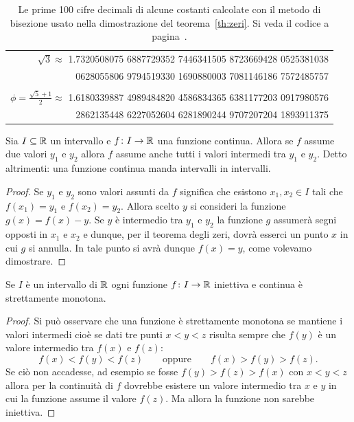 \begin{table}
\begin{center}
\begin{tabular}{r}
\\
$\sqrt 3 \approx$ \ttfamily\footnotesize 
1.7320508075 6887729352 7446341505 8723669428 0525381038 \\ \ttfamily\footnotesize
0628055806 9794519330 1690880003 7081146186 7572485757 \\
\\
$\phi = \frac{\sqrt 5+1}{2} \approx $ \ttfamily\footnotesize 
1.6180339887 4989484820 4586834365 6381177203 0917980576 \\ \ttfamily\footnotesize
2862135448 6227052604 6281890244 9707207204 1893911375
  \end{tabular}
\end{center}
\caption{Le prime 100 cifre decimali di alcune
costanti calcolate con il metodo di bisezione usato nella dimostrazione
del teorema~\ref{th:zeri}.
Si veda il codice a pagina~\pageref{code:bisection}.}
\label{fig:cifre_sqrt2}
\end{table}

\begin{theorem}
\label{th:valori_intermedi}%
\mymark{**}%
%
%
%
Sia $I\subseteq {\mathbb R}$ un intervallo e $f\colon I \to {\mathbb R}$ una
funzione continua.
Allora se $f$ assume due valori $y_1$ e $y_2$ allora $f$
assume anche tutti i valori intermedi tra $y_1$ e $y_2$.
Detto altrimenti: una funzione continua
manda intervalli in intervalli.
\end{theorem}
%
\begin{proof}
Se $y_1$ e $y_2$ sono valori assunti da $f$ significa
che esistono $x_1,x_2 \in I$ tali che $f(x_1)= y_1$ e $f(x_2)=y_2$.
Allora scelto $y$ si consideri la funzione $g(x) = f(x)-y$.
Se $y$ è intermedio tra $y_1$ e $y_2$ la funzione $g$ assumerà
segni opposti in $x_1$ e $x_2$ e dunque, per il teorema degli zeri,
dovrà esserci un punto $x$ in cui $g$ si annulla. In tale punto
si avrà dunque $f(x)=y$, come volevamo dimostrare.
\end{proof}

\begin{lemma}
\label{ex:inversa_monotona}%
Se $I$ è un intervallo di ${\mathbb R}$ ogni funzione $f\colon I \to {\mathbb R}$
iniettiva e continua è strettamente monotona.
\end{lemma}
%
\begin{proof}
Si può osservare che una funzione è strettamente monotona se mantiene i valori
intermedi cioè se dati tre punti
$x<y<z$ risulta sempre che $f(y)$ è un valore intermedio tra $f(x)$ e $f(z)$:
\[
  f(x)< f(y) <f(z) \qquad\text{oppure} \qquad f(x)> f(y) > f(z).
\]
Se ciò non accadesse, ad esempio se fosse $f(y)>f(z)>f(x)$ con $x<y<z$
allora per la continuità di $f$ dovrebbe esistere un valore intermedio
tra $x$ e $y$ in cui la funzione assume il valore $f(z)$. Ma allora la funzione
non sarebbe iniettiva.
\end{proof}

